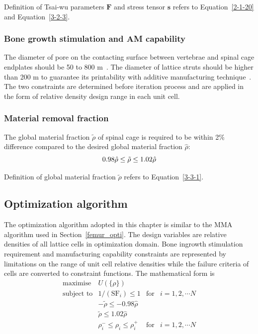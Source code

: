 \documentclass[12pt]{extbook}
\begin{document}
Definition of Tsai-wu parameters $\bm{F}$ and stress tensor $\bm{s}$ refers to Equation~\ref{2-1-20} and Equation~\ref{3-2-3}.\\

\subsubsection{Bone growth stimulation and AM capability}

The diameter of pore on the contacting surface between vertebrae and spinal cage endplates should be 50 to 800 {\textmu}m~\cite{harrysson2008direct}. The diameter of lattice struts should be higher than 200 {\textmu}m to guarantee its printability with additive manufacturing technique~\cite{de2013bone}. The two constraints are determined before iteration process and are applied in the form of relative density design range in each unit cell.\\ 


\subsubsection{Material removal fraction}

The global material fraction $\tilde{\rho}$ of spinal cage is required to be within 2\% difference compared to the desired global material fraction $\hat{\rho}$:
\begin{equation}
0.98\hat{\rho} \leq \tilde{\rho} \leq 1.02\hat{\rho}\\
\label{4-3-2}
\end{equation}

Definition of global material fraction $\tilde{\rho}$ refers to Equation~\ref{3-3-1}.\\



\subsection{Optimization algorithm}

The optimization algorithm adopted in this chapter is similar to the MMA algorithm used in Section~\ref{femur_opti}. The design variables are relative densities of all lattice cells in optimization domain. Bone ingrowth stimulation requirement and manufacturing capability constraints are represented by limitations on the range of unit cell relative densities while the failure criteria of cells are converted to constraint functions. The mathematical form is
\begin{equation}
\begin{array}{llll}
\text{maximise} & U(\{\rho\})\\
\text{subject to} & 1/(\text{SF}_i) \leq 1 & \text{for} & i = 1, 2,\cdots N\\
& -\tilde{\rho} \leq -0.98\hat{\rho}\\
& \tilde{\rho} \leq 1.02\hat{\rho}\\
& \rho_i^- \leq \rho_{i} \leq \rho_i^+ & \text{for} & i = 1, 2,\cdots N\\
\end{array}
\label{4-4-T1}
\end{equation}
\end{document}
